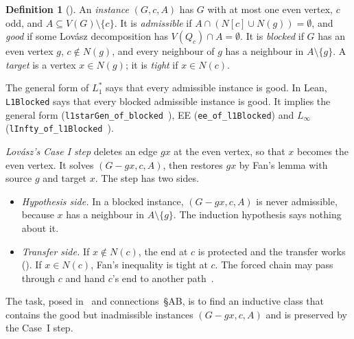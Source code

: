 \documentclass[11pt]{amsart}
\theoremstyle{definition}
\newtheorem{definition}[theorem]{Definition}
\begin{document}
\begin{definition}[\cite{L1S}]
An \emph{instance} $(G,c,A)$ has $G$ with at most one even vertex, $c$ odd, and
$A\subseteq V(G)\setminus\{c\}$. It is \emph{admissible} if $A\cap(N[c]\cup N(g))=\emptyset$, and
\emph{good} if some Lov\'asz decomposition has $V(Q_c)\cap A=\emptyset$. It is \emph{blocked} if $G$
has an even vertex $g$, $c\notin N(g)$, and every neighbour of $g$ has a neighbour in
$A\setminus\{g\}$. A \emph{target} is a vertex $x\in N(g)$; it
is \emph{tight} if $x\in N(c)$.
\end{definition}

The general form of $L_1^*$ says that every admissible instance is good. In Lean, \texttt{L1Blocked}
says that every blocked admissible instance is good. It implies the general form
(\texttt{l1starGen\_of\_blocked}~\cite{L1S}), EE (\texttt{ee\_of\_l1Blocked}) and $L_\infty$
(\texttt{lInfty\_of\_l1Blocked}~\cite{TF}).

\emph{Lov\'asz's Case I step} deletes an edge $gx$ at the even vertex, so that $x$ becomes the even
vertex. It solves $(G-gx,c,A)$, then restores $gx$ by Fan's lemma with source $g$ and target $x$.
The step has two sides.
\begin{itemize}
\item \emph{Hypothesis side.} In a blocked instance, $(G-gx,c,A)$ is never admissible, because $x$
has a neighbour in $A\setminus\{g\}$. The induction hypothesis says nothing about it.
\item \emph{Transfer side.} If $x\notin N(c)$, the end at $c$ is protected and the transfer works
(\cite[Lemma~2.4]{L1S}). If $x\in N(c)$, Fan's inequality is tight at $c$. The forced chain may pass
through $c$ and hand $c$'s end to another path~\cite{TF}.
\end{itemize}
The task, posed in~\cite[\S7]{TF} and connections~\S AB, is to find an inductive class that contains
the good but inadmissible instances $(G-gx,c,A)$ and is preserved by the Case~I step.
\end{document}
